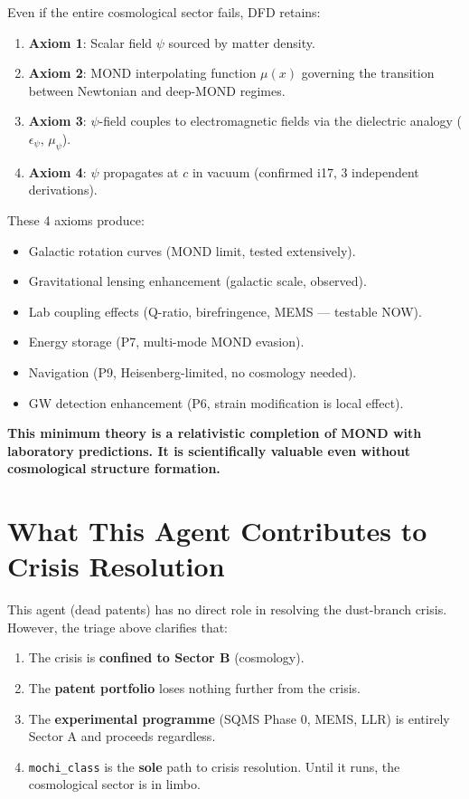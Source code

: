 \documentclass[11pt]{article}
\begin{document}
Even if the entire cosmological sector fails, DFD retains:

\begin{enumerate}
\item \textbf{Axiom 1}: Scalar field $\psi$ sourced by matter density.
\item \textbf{Axiom 2}: MOND interpolating function $\mu(x)$ governing
  the transition between Newtonian and deep-MOND regimes.
\item \textbf{Axiom 3}: $\psi$-field couples to electromagnetic fields
  via the dielectric analogy ($\epsilon_\psi$, $\mu_\psi$).
\item \textbf{Axiom 4}: $\psi$ propagates at $c$ in vacuum (confirmed i17,
  3 independent derivations).
\end{enumerate}

These 4 axioms produce:
\begin{itemize}
\item Galactic rotation curves (MOND limit, tested extensively).
\item Gravitational lensing enhancement (galactic scale, observed).
\item Lab coupling effects (Q-ratio, birefringence, MEMS --- testable NOW).
\item Energy storage (P7, multi-mode MOND evasion).
\item Navigation (P9, Heisenberg-limited, no cosmology needed).
\item GW detection enhancement (P6, strain modification is local effect).
\end{itemize}

\textbf{This minimum theory is a relativistic completion of MOND with
laboratory predictions. It is scientifically valuable even without
cosmological structure formation.}

\section{What This Agent Contributes to Crisis Resolution}

This agent (dead patents) has no direct role in resolving the dust-branch
crisis. However, the triage above clarifies that:

\begin{enumerate}
\item The crisis is \textbf{confined to Sector B} (cosmology).
\item The \textbf{patent portfolio} loses nothing further from the crisis.
\item The \textbf{experimental programme} (SQMS Phase 0, MEMS, LLR) is
  entirely Sector A and proceeds regardless.
\item \texttt{mochi\_class} is the \textbf{sole} path to crisis resolution.
  Until it runs, the cosmological sector is in limbo.
\end{enumerate}
\end{document}
